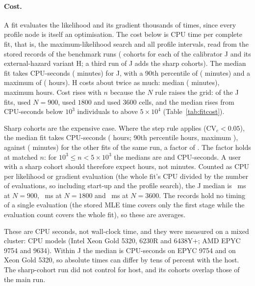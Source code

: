 \paragraph{Cost.} A fit evaluates the likelihood and its gradient thousands of times, since every profile node is itself an
optimisation. The cost below is CPU time per complete fit, that is, the maximum-likelihood search and all profile
intervals, read from the stored records of the benchmark runs ( cohorts for each of the calibrator J and its
external-hazard variant H; a third run of J adds the sharp cohorts). The median fit takes  CPU-seconds
( minutes) for J, with a 90th percentile of  ( minutes) and a
maximum of  ( hours). H costs about twice as much: median 
( minutes), maximum  hours. Cost rises with $n$ because the $N$ rule raises the grid:
of the J fits,  used $N=900$,  used $1800$ and  used $3600$ cells, and
the median rises from  CPU-seconds below $10^3$ individuals to  above
$5\times10^4$ (Table~\ref{tab:fitcost}).

Sharp cohorts are the expensive case. Where the step rule applies ($\mathrm{CV}_c<0.05$), the median fit takes
 CPU-seconds ( hours; 90th percentile  hours, maximum
), against  ( minutes) for the other
 fits of the same run, a factor of . The factor holds at matched $n$: for $10^3\le n<5\times10^3$ the
medians are  and  CPU-seconds. A user with a sharp cohort should therefore
expect hours, not minutes. Counted as CPU per likelihood or gradient evaluation (the whole fit's CPU divided by the number of
evaluations, so including start-up and the profile search), the J median is ~ms at $N=900$,
~ms at $N=1800$ and ~ms at $N=3600$. The records hold no timing of a single evaluation
(the stored MLE time covers only the first stage while the evaluation count covers the whole fit), so these are averages.

These are CPU seconds, not wall-clock time, and they were measured on a mixed cluster:  CPU models
(Intel Xeon Gold 5320, 6230R and 6438Y+; AMD EPYC 9754 and 9634). Within J the median is  CPU-seconds on EPYC 9754 and
 on Xeon Gold 5320, so absolute times can differ by tens of percent with the host. The sharp-cohort
run did not control for host, and its cohorts overlap those of the main run.


